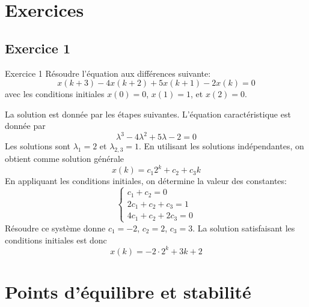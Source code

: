     \section{Exercices}
        \subsection{Exercice 1}
            \begin{exercise}{Exercice 1}
                Résoudre l'équation aux différences suivante:
                \begin{equation}
                    x(k+3)-4x(k+2)+5x(k+1)-2x(k) = 0
                \end{equation}
                avec les conditions initiales $x(0) = 0$, $x(1) = 1$, et $x(2) = 0$.
            \end{exercise}
            La solution est donnée par les étapes suivantes. L'équation caractéristique est donnée par
            \begin{equation}
                \lambda^3-4\lambda^2+5\lambda-2 = 0
            \end{equation}
            Les solutions sont $\lambda_1 = 2$ et $\lambda_{2,3} = 1$.
            En utilisant les solutions indépendantes, on obtient comme solution générale
            \begin{equation}
                x(k) = c_1 2^k+c_2+c_3 k
            \end{equation}
            En appliquant les conditions initiales, on détermine la valeur des constantes:
            \begin{equation}
                \begin{cases}
                    c_1+c_2 = 0 \\
                    2c_1+c_2+c_3 = 1 \\
                    4c_1+c_2+2c_3 = 0
                \end{cases}
            \end{equation}
            Résoudre ce système donne $c_1 = -2$, $c_2 = 2$, $c_3 = 3$.
            La solution satisfaisant les conditions initiales est donc
            \begin{equation}
                x(k) = -2 \cdot 2^k+3k+2
            \end{equation}

    \section{Points d'équilibre et stabilité}
